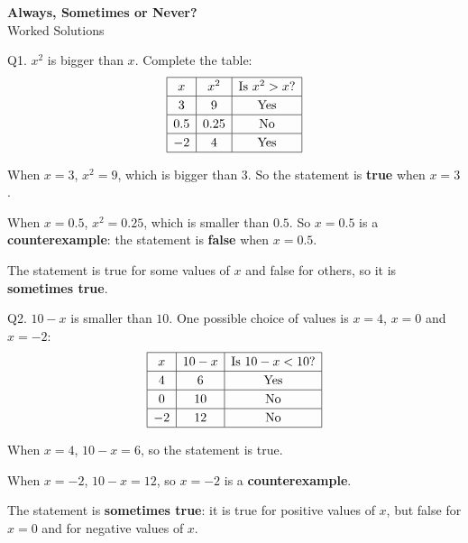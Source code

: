 \documentclass[14pt,a4paper]{extarticle}
\begin{document}
\begin{center}
  {\LARGE\bfseries Always, Sometimes or Never?}\\[2pt]
  {\large Worked Solutions}
\end{center}

\vspace{4pt}

\begin{sol}{Q1. \(x^2\) is bigger than \(x\).}
Complete the table:
\[
\renewcommand{\arraystretch}{1.2}
\begin{array}{|c|c|c|}
\hline
x & x^2 & \text{Is } x^2 > x?\\
\hline
3 & 9 & \text{Yes}\\
\hline
0.5 & 0.25 & \text{No}\\
\hline
-2 & 4 & \text{Yes}\\
\hline
\end{array}
\]

When \(x=3\), \(x^2=9\), which is bigger than \(3\). So the statement is
\textbf{true} when \(x=3\).

When \(x=0.5\), \(x^2=0.25\), which is smaller than \(0.5\). So \(x=0.5\)
is a \textbf{counterexample}: the statement is \textbf{false} when
\(x=0.5\).

The statement is true for some values of \(x\) and false for others, so it
is \textbf{sometimes true}.
\end{sol}

\begin{sol}{Q2. \(10-x\) is smaller than \(10\).}
One possible choice of values is \(x=4\), \(x=0\) and \(x=-2\):
\[
\renewcommand{\arraystretch}{1.2}
\begin{array}{|c|c|c|}
\hline
x & 10-x & \text{Is } 10-x < 10?\\
\hline
4 & 6 & \text{Yes}\\
\hline
0 & 10 & \text{No}\\
\hline
-2 & 12 & \text{No}\\
\hline
\end{array}
\]

When \(x=4\), \(10-x=6\), so the statement is true.

When \(x=-2\), \(10-x=12\), so \(x=-2\) is a \textbf{counterexample}.

The statement is \textbf{sometimes true}: it is true for positive values
of \(x\), but false for \(x=0\) and for negative values of \(x\).
\end{sol}
\end{document}
